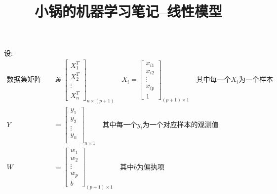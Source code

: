 \documentclass[withoutpreface,bwprint]{cumcmthesis} %
\title{小锅的机器学习笔记--线性模型}
\begin{document}
	\makeatletter %
	\renewcommand{\section}{\@startsection{section}{300}{0mm}
		{-\baselineskip}{0.5\baselineskip}{\bf\leftline}}
	\renewcommand{\subsection}{\@startsection{section}{300}{5mm}
		{-\baselineskip}{0.5\baselineskip}{\bf\leftline}}
		


 \maketitle

设:
\begin{align*}
	\text{数据集矩阵为:}
	\quad
	X&=\left[
	\begin{array}{c}
		X_1^T\\
		X_2^T\\
		\vdots\\
		X_n^T
	\end{array}
	\right]_{n{\times}(p+1)}
	\quad X_i=\left[
	\begin{array}{c}
		x_{i1}\\
		x_{i2}\\
		\vdots\\
		x_{ip}\\
		1	
	\end{array}
	\right]_{(p+1){\times}1}
	\quad \textbf{其中每一个}X_i\textbf{为一个样本}\\
	Y&=\left[
	\begin{array}{c}
		y_{1}\\
		y_{2}\\
		\vdots\\
		y_{n}\\	
	\end{array}
	\right]_{n{\times}1} \quad
	\textbf{其中每一个}y_i\textbf{为一个对应样本的观测值}\\
	W&=\left[
	\begin{array}{c}
		w_1\\
		w_2\\
		\vdots\\
		w_p\\
		b
	\end{array}		
	\right]_{(p+1){\times}1} \quad \textbf{其中$b$为偏执项}
\end{align*}
\end{document}
